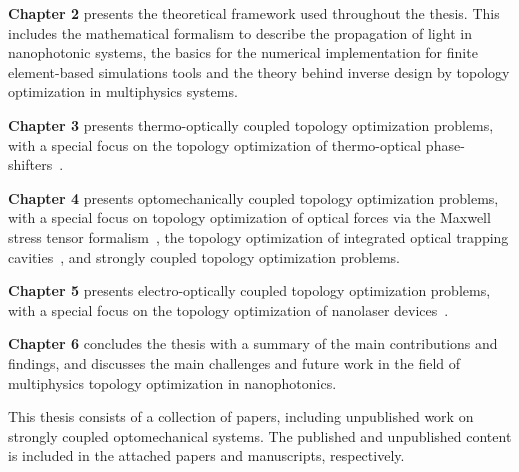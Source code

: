 \textbf{Chapter 2} presents the theoretical framework used throughout the thesis. This includes the mathematical formalism
to describe the propagation of light in nanophotonic systems, the basics for the numerical implementation for 
finite element-based simulations tools and the theory behind inverse design by topology optimization in multiphysics systems.

\textbf{Chapter 3} presents thermo-optically coupled topology optimization problems, with a special focus on the topology optimization of 
thermo-optical phase-shifters~\cite{ownpub0}.

\textbf{Chapter 4} presents optomechanically coupled topology optimization problems, with a special focus on topology optimization of optical forces via
the Maxwell stress tensor formalism~\cite{ownpub2}, the topology optimization of integrated optical trapping  cavities~\cite{ownpub1, ownpub3}, and strongly coupled topology optimization 
problems.

\textbf{Chapter 5} presents electro-optically coupled topology optimization problems, with a special focus on the topology optimization of 
nanolaser devices~\cite{ownpub4}.

\textbf{Chapter 6} concludes the thesis with a summary of the main contributions and findings, and discusses the main challenges
and future work in the field of multiphysics topology optimization in nanophotonics.

This thesis consists of a collection of papers, including unpublished work on
strongly coupled optomechanical systems. The published and unpublished content is included in the attached
papers and manuscripts, respectively.